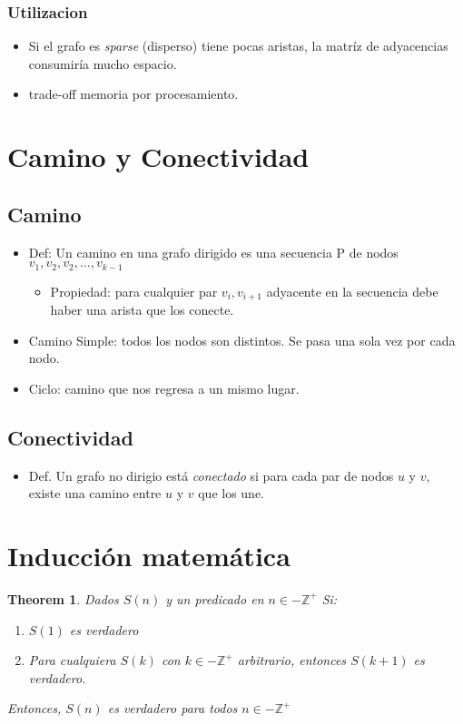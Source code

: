 \documentclass[12pt, fleqn]{article}
\newtheorem{theorem}{Theorem}[section]
\begin{document}
            \subsubsection{Utilizacion}
            \begin{itemize}
                \item Si el grafo es \emph{sparse} (disperso) tiene pocas aristas, la matríz de adyacencias consumiría mucho espacio.
                \item trade-off memoria por procesamiento.
            \end{itemize}
    \section{Camino y Conectividad}
    \subsection{Camino}
        \begin{itemize}
            \item Def: Un camino en una grafo dirigido es una secuencia P de nodos $v_1, v_2, v_2, \dots, v_{k-1}$
            \begin{itemize}
                \item Propiedad: para cualquier par $v_i, v_{i+1}$ adyacente en la secuencia debe haber una arista que los conecte.
            \end{itemize} 
            \item Camino Simple: todos los nodos son distintos. Se pasa una sola vez por cada nodo.
            \item Ciclo: camino que nos regresa a un mismo lugar. 
        \end{itemize} 
    \subsection{Conectividad}
        \begin{itemize}
            \item Def. Un grafo no dirigio está \emph{conectado} si para cada par de nodos $u$ y $v$, existe una camino entre $u$ y $v$ que los une.
        \end{itemize}
    \section{Inducción matemática}
        \begin{theorem}
            Dados $S(n)$ y un predicado en $n \in - \mathbb{Z}^+$ Si:
            \begin{enumerate}
                \item $S(1)$ es verdadero
                \item Para cualquiera $S(k)$ con $k \in - \mathbb{Z}^+$ arbitrario, entonces $S(k+1)$ es verdadero.
            \end{enumerate}
            Entonces, $S(n)$ es verdadero para todos $n \in - \mathbb{Z}^+$ 
        \end{theorem}
\end{document}
